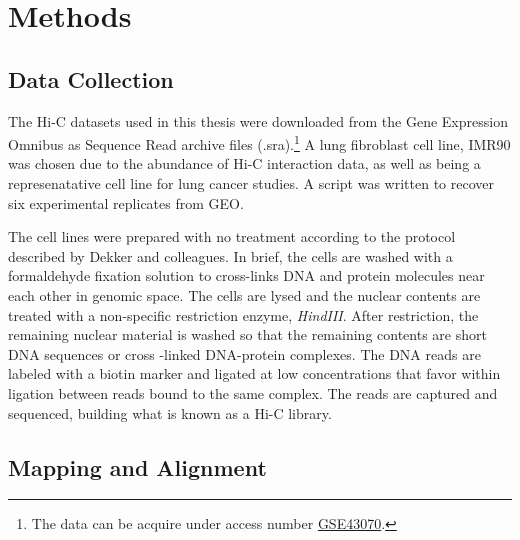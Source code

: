 \documentclass[phd,tocprelim]{cornell}
\begin{document}


\chapter{Methods}

\section{Data Collection}

The Hi-C datasets used in this thesis were downloaded from the Gene
Expression Omnibus as Sequence Read archive files
(.sra).\footnote{The data can be acquire under access number \href{http://www.ncbi.nlm.nih.gov/geo/query/acc.cgi?acc=GSE43070}{GSE43070}.\cite{ren2013}}
A lung fibroblast cell line, IMR90 was chosen due to the abundance of
Hi-C interaction data, as well as being a represenatative cell line
for lung cancer studies.  A script was written to recover six experimental
replicates from GEO.

The cell lines were prepared with no treatment according to the protocol
described by Dekker and colleagues\cite{dekker2013}.  In brief, the cells
are washed with a formaldehyde fixation solution to cross-links
DNA and protein molecules near each other in genomic space.  The cells are
lysed and the nuclear contents are treated with a non-specific restriction
enzyme, \textit{HindIII}.  After restriction, the remaining nuclear material
is washed so that the remaining contents are short DNA sequences or cross
-linked DNA-protein complexes.  The DNA reads are labeled with a biotin
marker and ligated at low concentrations that favor within ligation between
reads bound to the same complex.  The reads are captured and sequenced,
building what is known as a Hi-C library.





\section{Mapping and Alignment}
\end{document}
